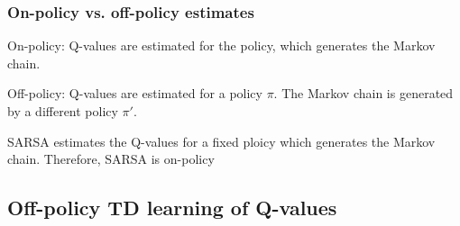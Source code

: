 \begin{frame} \frametitle{On-policy vs. off-policy estimates}
	\begin{block}{On-policy:}
		Q-values are estimated for the policy, which generates the Markov chain.
	\end{block}
	
	\vspace{5mm}
	
	\begin{block}{Off-policy:}
		Q-values are estimated for a policy $\pi$. The Markov chain is generated by a different policy $\pi'$.
	\end{block}
	
	
	SARSA estimates the Q-values for a fixed ploicy which generates the Markov chain. Therefore, SARSA is on-policy
\end{frame}

\subsection{Off-policy TD learning of Q-values}

